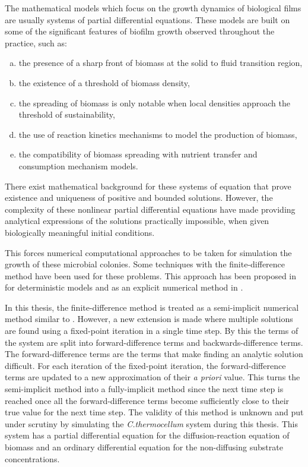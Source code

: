 The mathematical models which focus on the growth dynamics of biological films are usually systems of partial differential equations.
These models are built on some of the significant features of biofilm growth observed throughout the practice, such as:
\begin{enumerate}[a)]
  \item the presence of a sharp front of biomass at the solid to fluid transition region,
  \item the existence of a threshold of biomass density,
  \item the spreading of biomass is only notable when local densities approach the threshold of sustainability,
  \item the use of reaction kinetics mechanisms to model the production of biomass,
  \item the compatibility of biomass spreading with nutrient transfer and consumption mechanism models.
\end{enumerate}
There exist mathematical background for these systems of equation that prove existence and uniqueness of positive and bounded solutions.
However, the complexity of these nonlinear partial differential equations have made providing analytical expressions of the solutions practically impossible, when given biologically meaningful initial conditions.

This forces numerical computational approaches to be taken for simulation the growth of these microbial colonies.
Some techniques with the finite-difference method have been used for these problems. 
This approach has been proposed in \cite{eberl2007finite} for deterministic models and as an explicit numerical method in \cite{macias-diaz2013efficientNonlinear}.

In this thesis, the finite-difference method is treated as a semi-implicit numerical method similar to \cite{eberl2007finite}.
However, a new extension is made where multiple solutions are found using a fixed-point iteration in a single time step.
By this the terms of the system are split into forward-difference terms and backwards-difference terms.
The forward-difference terms are the terms that make finding an analytic solution difficult.
For each iteration of the fixed-point iteration, the forward-difference terms are updated to a new approximation of their \textit{a priori} value.
This turns the semi-implicit method into a fully-implicit method since the next time step is reached once all the forward-difference terms become sufficiently close to their true value for the next time step.
The validity of this method is unknown and put under scrutiny by simulating the \textit{C.thermocellum} system during this thesis.
This system has a partial differential equation for the diffusion-reaction equation of biomass and an ordinary differential equation for the non-diffusing substrate concentrations.

